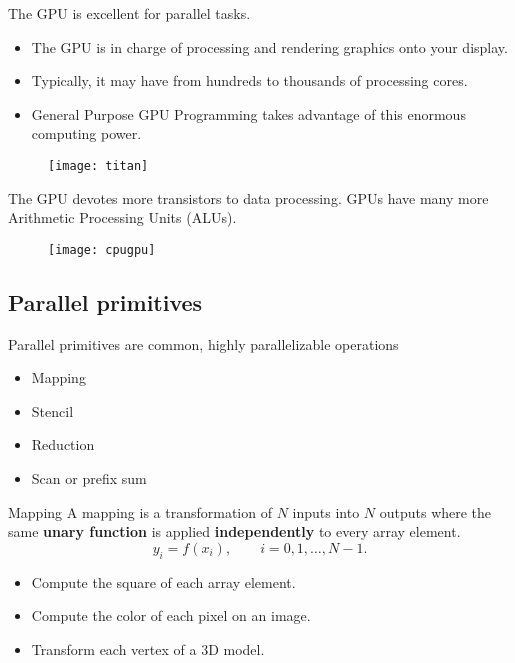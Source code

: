 \documentclass[xcolor={dvipsnames}]{beamer}
\begin{document}
\begin{frame}{The GPU is excellent for parallel tasks.}
\begin{itemize}[<+->]
\item The GPU is in charge of processing and rendering graphics onto your display.
\bigskip
\item Typically, it may have from hundreds to thousands of processing cores.
\bigskip
\item General Purpose GPU Programming takes advantage of this enormous computing power.
\end{itemize}

\begin{figure}
\centering
\texttt{[image: titan]}
\label{fig:titan}
\end{figure}
\end{frame}


\begin{frame}{The GPU devotes more transistors to data processing.}
GPUs have many more Arithmetic Processing Units (ALUs).
\begin{figure}
\centering
\texttt{[image: cpugpu]}
\label{fig:cpugpu}
\end{figure}
\end{frame}

\subsection{Parallel primitives}

\begin{frame}{Parallel primitives are common, highly parallelizable operations}{}

\begin{itemize}
\item Mapping
\item Stencil
\item Reduction
\item Scan or prefix sum
\end{itemize}
\end{frame}

\begin{frame}{Mapping}{}
A mapping is a transformation of $N$ inputs into $N$ outputs where the same \textbf{unary function} is applied \textbf{independently} to every array element.
\pause 
\begin{equation*}
y_i=f(x_i),\qquad i=0,1,\ldots,N-1.
\end{equation*}

\begin{itemize}[<+(1)->]
\item Compute the square of each array element.
\item Compute the color of each pixel on an image.
\item Transform each vertex of a 3D model.
\end{itemize}
\end{frame}
\end{document}
